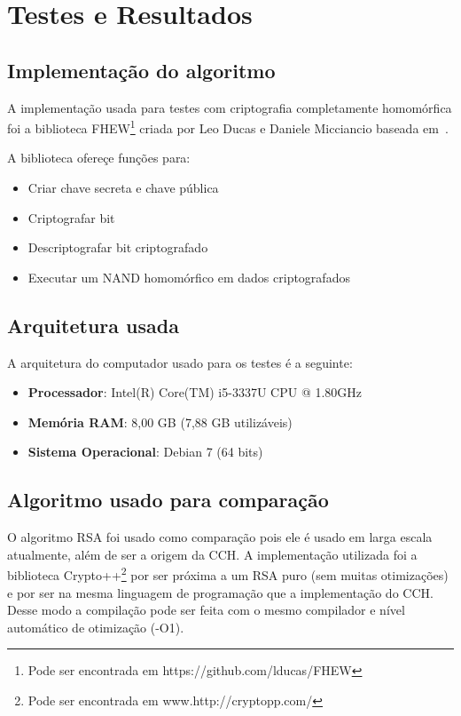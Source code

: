 \chapter{Testes e Resultados}
\label{testes}
\section{Implementação do algoritmo}
\label{resultados}
A implementação usada para testes com criptografia completamente homomórfica foi a biblioteca FHEW\footnote{Pode ser encontrada em https://github.com/lducas/FHEW} criada por Leo Ducas e Daniele Micciancio baseada em~\cite{fhew}.

A biblioteca ofereçe funções para:
\begin{itemize}
	\item Criar chave secreta e chave pública
	\item Criptografar bit
	\item Descriptografar bit criptografado
	\item Executar um NAND homomórfico em dados criptografados
\end{itemize}

\section{Arquitetura usada}
A arquitetura do computador usado para os testes é a seguinte:
\begin{itemize}
	\item \textbf{Processador}: Intel(R) Core(TM) i5-3337U CPU @ 1.80GHz
	\item \textbf{Memória RAM}: 8,00 GB (7,88 GB utilizáveis)
	\item \textbf{Sistema Operacional}: Debian 7 (64 bits)
\end{itemize}

\section{Algoritmo usado para comparação}
O algoritmo RSA foi usado como comparação pois ele é usado em larga escala atualmente, além de ser a origem da CCH. A implementação utilizada foi a biblioteca Crypto++\footnote{Pode ser encontrada em www.http://cryptopp.com/} por ser próxima a um RSA puro (sem muitas otimizações) e por ser na mesma linguagem de programação que a implementação do CCH. Desse modo a compilação pode ser feita com o mesmo compilador e nível automático de otimização (-O1).
	

